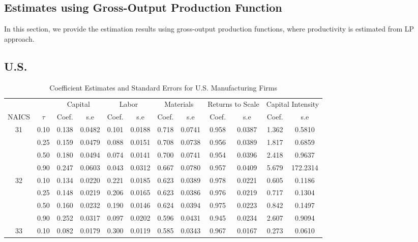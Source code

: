 \documentclass[12pt]{article}
\begin{document}
\begin{appendices}
\newpage

\section{Estimates using Gross-Output Production Function} \label{gross}
In this section, we provide the estimation results using gross-output production functions, where productivity is estimated from LP approach.

\subsection{U.S.}

\begin{table}[H]
\centering
\caption{Coefficient Estimates and Standard Errors for U.S. Manufacturing Firms}
\small
\begin{tabular}{cccccccccccc}
  \hline\hline & & \multicolumn{2}{c}{Capital}  & \multicolumn{2}{c}{Labor} & \multicolumn{2}{c}{Materials} & \multicolumn{2}{c}{Returns to Scale} & \multicolumn{2}{c}{Capital Intensity}\\ \cmidrule(lr){3-4} \cmidrule(lr){5-6} \cmidrule(lr){7-8} \cmidrule(lr){9-10} \cmidrule(lr){11-12}NAICS & $\tau$ & Coef. & s.e & Coef. & s.e & Coef. & s.e & Coef. & s.e & Coef. & s.e \\ 
  \hline
31 & 0.10 & 0.138 & 0.0482 & 0.101 & 0.0188 & 0.718 & 0.0741 & 0.958 & 0.0387 & 1.362 & 0.5810 \\ 
   & 0.25 & 0.159 & 0.0479 & 0.088 & 0.0151 & 0.708 & 0.0738 & 0.956 & 0.0389 & 1.817 & 0.6859 \\ 
   & 0.50 & 0.180 & 0.0494 & 0.074 & 0.0141 & 0.700 & 0.0741 & 0.954 & 0.0396 & 2.418 & 0.9637 \\ 
   & 0.90 & 0.247 & 0.0603 & 0.043 & 0.0312 & 0.667 & 0.0780 & 0.957 & 0.0409 & 5.679 & 172.2314 \\ 
  32 & 0.10 & 0.134 & 0.0220 & 0.221 & 0.0185 & 0.623 & 0.0389 & 0.978 & 0.0221 & 0.605 & 0.1186 \\ 
   & 0.25 & 0.148 & 0.0219 & 0.206 & 0.0165 & 0.623 & 0.0386 & 0.976 & 0.0219 & 0.717 & 0.1304 \\ 
   & 0.50 & 0.160 & 0.0232 & 0.190 & 0.0146 & 0.624 & 0.0394 & 0.975 & 0.0223 & 0.842 & 0.1497 \\ 
   & 0.90 & 0.252 & 0.0317 & 0.097 & 0.0202 & 0.596 & 0.0431 & 0.945 & 0.0234 & 2.607 & 0.9094 \\ 
  33 & 0.10 & 0.082 & 0.0179 & 0.300 & 0.0119 & 0.585 & 0.0343 & 0.967 & 0.0167 & 0.273 & 0.0610 \\ 

\end{tabular}
\end{table}
\end{appendices}
\end{document}
